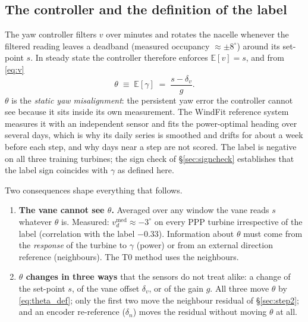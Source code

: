 \documentclass[11pt,a4paper]{article}
\theoremstyle{remark}
\newcommand{\med}{\operatorname{med}}
\newcommand{\E}{\mathbb{E}}
\newcommand{\dg}{^{\circ}}
\begin{document}
\subsection{The controller and the definition of the label}
The yaw controller filters $v$ over minutes and rotates the nacelle whenever the
filtered reading leaves a deadband (measured occupancy $\approx\pm8\dg$) around
its set-point $s$. In steady state the controller therefore enforces
$\E[v]=s$, and from \eqref{eq:v}
\begin{equation}
  \theta \;\equiv\; \E[\gamma] \;=\; \frac{s-\delta_v}{g}.
  \label{eq:theta_def}
\end{equation}
$\theta$ is the \emph{static yaw misalignment}: the persistent yaw error the
controller cannot see because it sits inside its own measurement. The WindFit
reference system measures it with an independent sensor and fits the
power-optimal heading over several days, which is why its daily series is
smoothed and drifts for about a week before each step, and why days near a step
are not scored. The label is negative on all three training turbines; the
sign check of \S\ref{sec:signcheck} establishes that the label sign coincides
with $\gamma$ as defined here.

Two consequences shape everything that follows.
\begin{enumerate}
\item \textbf{The vane cannot see $\theta$.} Averaged over any window the vane
      reads $s$ whatever $\theta$ is. Measured: $v^{\med}_d\approx-3\dg$ on
      every PPP turbine irrespective of the label (correlation with the label
      $-0.33$). Information about $\theta$ must come from the \emph{response} of
      the turbine to $\gamma$ (power) or from an external direction reference
      (neighbours). The T0 method uses the neighbours.
\item \textbf{$\theta$ changes in three ways} that the sensors do not treat
      alike: a change of the set-point $s$, of the vane offset $\delta_v$, or of
      the gain $g$. All three move $\theta$ by \eqref{eq:theta_def}; only the
      first two move the neighbour residual of \S\ref{sec:step2}; and an encoder
      re-reference ($\delta_n$) moves the residual without moving $\theta$ at
      all.
\end{enumerate}
\end{document}
